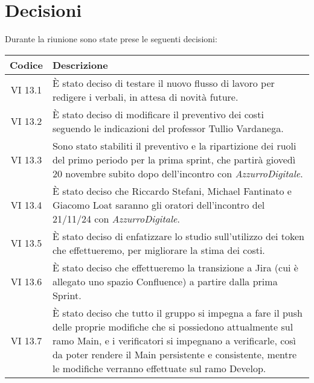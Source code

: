
\section{Decisioni}

Durante la riunione sono state prese le seguenti decisioni:

\vspace{0.5cm}

\begin{table}[htbp]
    \centering
    \begin{tabular}{|c|p{}|}
        \hline
        \rowcolor[gray]{0.75}
        \textbf{Codice} & \textbf{Descrizione}\\
        \hline
        VI 13.1 & È stato deciso di testare il nuovo flusso di lavoro per redigere i verbali, in attesa di novità future. \\
        \hline
        VI 13.2 & È stato deciso di modificare il preventivo dei costi seguendo le indicazioni del professor Tullio Vardanega. \\
        \hline
        VI 13.3 & Sono stato stabiliti il preventivo e la ripartizione dei ruoli del primo periodo per la prima sprint, che partirà 
        giovedì 20 novembre subito dopo dell'incontro con \emph{AzzurroDigitale}. \\
        \hline
        VI 13.4 & È stato deciso che Riccardo Stefani, Michael Fantinato e Giacomo Loat saranno gli oratori dell'incontro del 21/11/24 con \emph{AzzurroDigitale}. \\
        \hline
        VI 13.5 & È stato deciso di enfatizzare lo studio sull'utilizzo dei token che effettueremo, per migliorare la stima dei costi. \\
        \hline
        VI 13.6 & È stato deciso che effettueremo la transizione a Jira (cui è allegato uno spazio Confluence) a partire dalla prima Sprint. \\
        \hline
        VI 13.7 & È stato deciso che tutto il gruppo si impegna a fare il push delle proprie modifiche che si possiedono attualmente sul ramo Main, e i 
        verificatori si impegnano a verificarle, così da poter rendere il Main persistente e consistente, mentre le modifiche verranno effettuate sul 
        ramo Develop. \\
        \hline
    \end{tabular}
\end{table}